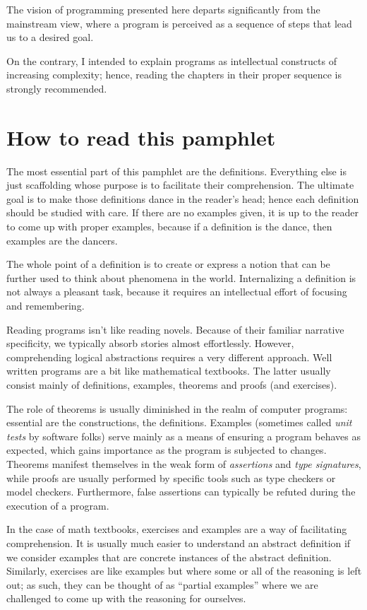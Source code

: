 The vision of programming presented here departs significantly
from the mainstream view, where a program is perceived
as a sequence of steps that lead us to a desired goal.

On the contrary, I intended to explain programs as
intellectual constructs of increasing complexity;
hence, reading the chapters in their proper sequence
is strongly recommended.

\section*{How to read this pamphlet}

The most essential part of this pamphlet are the definitions.
Everything else is just scaffolding whose purpose is to
facilitate their comprehension. The ultimate goal is to
make those definitions dance in the reader's head; hence
each definition should be studied with care. If there are
no examples given, it is up to the reader to come up
with proper examples, because if a definition is the
dance, then examples are the dancers.

The whole point of a definition is to create or express
a notion that can be further used to think about phenomena
in the world. Internalizing a definition is not always
a pleasant task, because it requires an intellectual
effort of focusing and remembering.

Reading programs isn't like reading novels. Because
of their familiar narrative specificity, we typically absorb
stories almost effortlessly. However, comprehending logical abstractions
requires a very different approach. Well written programs
are a bit like mathematical textbooks. The latter usually
consist mainly of definitions, examples, theorems and proofs
(and exercises).

The role of theorems is usually diminished in the realm
of computer programs: essential are the constructions,
the definitions. Examples (sometimes called \textit{unit
tests} by software folks) serve mainly as a means
of ensuring a program behaves as expected, which gains
importance as the program is subjected to changes.
Theorems manifest themselves in the weak form of \textit{assertions}
and \textit{type signatures}, while proofs are usually performed
by specific tools such as type checkers or model checkers.
Furthermore, false assertions can typically be refuted
during the execution of a program.

In the case of math textbooks, exercises and examples
are a way of facilitating comprehension. It is usually
much easier to understand an abstract definition if
we consider examples that are concrete instances of the abstract
definition.  Similarly, exercises are like examples but where some or
all of the reasoning is left out; as such, they can be thought of as
``partial examples'' where we are challenged to come up with the
reasoning for ourselves.

